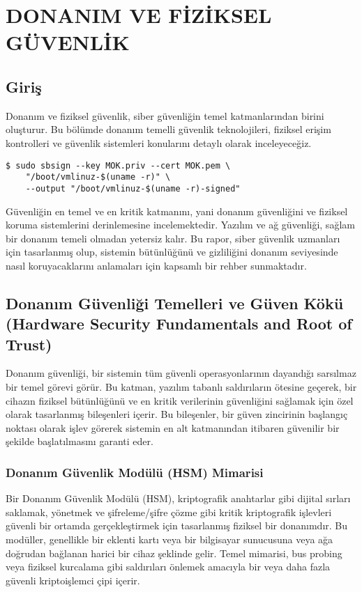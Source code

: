 \chapter{DONANIM VE FİZİKSEL GÜVENLİK}

\section*{Giriş}
Donanım ve fiziksel güvenlik, siber güvenliğin temel katmanlarından birini oluşturur. Bu bölümde donanım temelli güvenlik teknolojileri, fiziksel erişim kontrolleri ve güvenlik sistemleri konularını detaylı olarak inceleyeceğiz.
    \begin{lstlisting}[breaklines=true,basicstyle=\ttfamily\footnotesize]
$ sudo sbsign --key MOK.priv --cert MOK.pem \
    "/boot/vmlinuz-$(uname -r)" \
    --output "/boot/vmlinuz-$(uname -r)-signed"
    \end{lstlisting}

Güvenliğin en temel ve en kritik katmanını, yani donanım güvenliğini ve fiziksel koruma sistemlerini derinlemesine incelemektedir. Yazılım ve ağ güvenliği, sağlam bir donanım temeli olmadan yetersiz kalır. Bu rapor, siber güvenlik uzmanları için tasarlanmış olup, sistemin bütünlüğünü ve gizliliğini donanım seviyesinde nasıl koruyacaklarını anlamaları için kapsamlı bir rehber sunmaktadır.

\section{Donanım Güvenliği Temelleri ve Güven Kökü (Hardware Security Fundamentals and Root of Trust)}

Donanım güvenliği, bir sistemin tüm güvenli operasyonlarının dayandığı sarsılmaz bir temel görevi görür. Bu katman, yazılım tabanlı saldırıların ötesine geçerek, bir cihazın fiziksel bütünlüğünü ve en kritik verilerinin güvenliğini sağlamak için özel olarak tasarlanmış bileşenleri içerir. Bu bileşenler, bir güven zincirinin başlangıç noktası olarak işlev görerek sistemin en alt katmanından itibaren güvenilir bir şekilde başlatılmasını garanti eder.

\subsection{Donanım Güvenlik Modülü (HSM) Mimarisi}

Bir Donanım Güvenlik Modülü (HSM), kriptografik anahtarlar gibi dijital sırları saklamak, yönetmek ve şifreleme/şifre çözme gibi kritik kriptografik işlevleri güvenli bir ortamda gerçekleştirmek için tasarlanmış fiziksel bir donanımdır. Bu modüller, genellikle bir eklenti kartı veya bir bilgisayar sunucusuna veya ağa doğrudan bağlanan harici bir cihaz şeklinde gelir. Temel mimarisi, bus probing veya fiziksel kurcalama gibi saldırıları önlemek amacıyla bir veya daha fazla güvenli kriptoişlemci çipi içerir.

